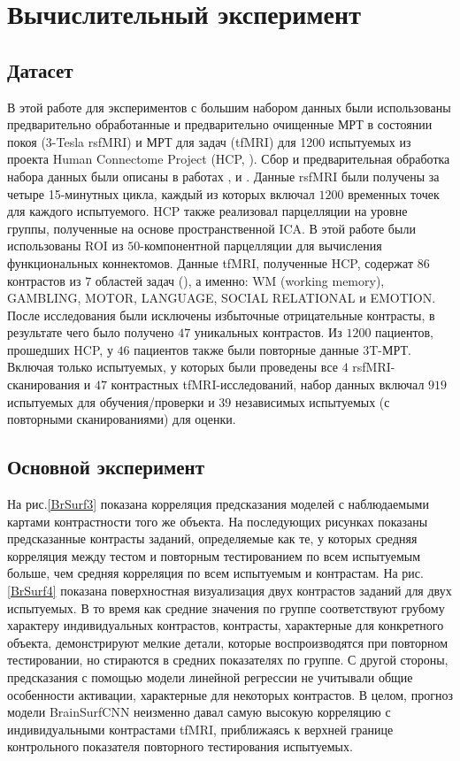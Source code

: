 \section{Вычислительный эксперимент}

\subsection{Датасет}

В этой работе для экспериментов с большим набором данных были использованы предварительно обработанные и предварительно очищенные МРТ в состоянии покоя (3-Tesla rsfMRI) и МРТ для задач (tfMRI) для 1200 испытуемых из проекта Human Connectome Project (HCP, \cite{glasser2013minimal}). 
Сбор и предварительная обработка набора данных были описаны в работах \cite{glasser2013minimal}, \cite{smith2013resting} и \cite{barch2013function}. 
Данные rsfMRI были получены за четыре 15-минутных цикла, каждый из которых включал $1200$ временных точек для каждого испытуемого. 
HCP также реализовал парцелляции на уровне группы, полученные на основе пространственной ICA. 
В этой работе были использованы ROI из $50$-компонентной парцелляции для вычисления функциональных коннектомов. 
Данные tfMRI, полученные HCP, содержат $86$ контрастов из $7$ областей задач (\cite{barch2013function}), а именно: WM (working memory), GAMBLING,
MOTOR, LANGUAGE, SOCIAL RELATIONAL и EMOTION. 
После исследования \cite{tavor2016task} были исключены избыточные отрицательные контрасты, в результате чего было получено $47$ уникальных контрастов. 
Из $1200$ пациентов, прошедших HCP, у $46$ пациентов также были повторные данные 3T-МРТ. 
Включая только испытуемых, у которых были проведены все $4$ rsfMRI-сканирования и $47$ контрастных tfMRI-исследований, набор данных включал $919$ испытуемых для обучения/проверки и $39$ независимых испытуемых (с повторными сканированиями) для оценки.


\subsection{Основной эксперимент}

На рис.\ref{BrSurf3} показана корреляция предсказания моделей с наблюдаемыми картами контрастности того же объекта.
На последующих рисунках показаны предсказанные контрасты заданий, определяемые как те, у которых средняя корреляция между тестом и повторным тестированием по всем испытуемым больше, чем средняя корреляция по всем испытуемым и контрастам.
На рис.\ref{BrSurf4} показана поверхностная визуализация двух контрастов заданий для двух испытуемых.
В то время как средние значения по группе соответствуют грубому характеру индивидуальных контрастов, контрасты, характерные для конкретного объекта, демонстрируют мелкие детали, которые воспроизводятся при повторном тестировании, но стираются в средних показателях по группе.
С другой стороны, предсказания с помощью модели линейной регрессии не учитывали общие особенности активации, характерные для некоторых контрастов.
В целом, прогноз модели BrainSurfCNN неизменно давал самую высокую корреляцию с индивидуальными контрастами tfMRI, приближаясь к верхней границе контрольного показателя повторного тестирования испытуемых.

